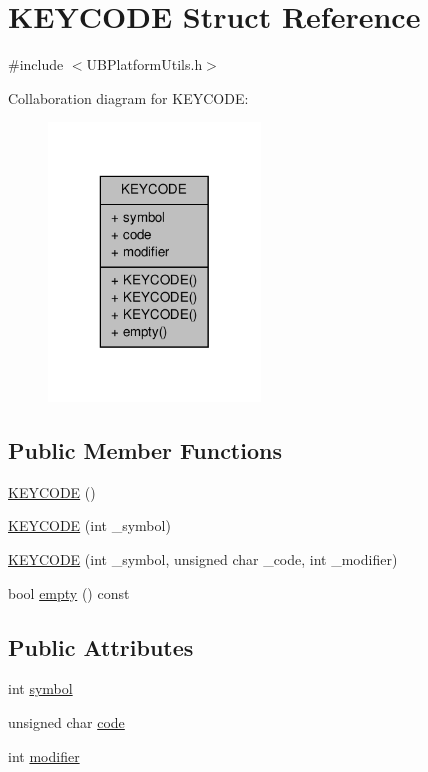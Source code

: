 \hypertarget{struct_k_e_y_c_o_d_e}{\section{K\-E\-Y\-C\-O\-D\-E Struct Reference}
\label{d2/dab/struct_k_e_y_c_o_d_e}
}


{\ttfamily \#include $<$U\-B\-Platform\-Utils.\-h$>$}



Collaboration diagram for K\-E\-Y\-C\-O\-D\-E\-:
\nopagebreak
\begin{figure}[H]
\begin{center}
\leavevmode
\includegraphics[width=160pt]{d5/d05/struct_k_e_y_c_o_d_e__coll__graph}
\end{center}
\end{figure}
\subsection*{Public Member Functions}
\begin{DoxyCompactItemize}
\item 
\hyperlink{struct_k_e_y_c_o_d_e_ae4350f0f4e202d007a74e78865318d94}{K\-E\-Y\-C\-O\-D\-E} ()
\item 
\hyperlink{struct_k_e_y_c_o_d_e_aad5ee6ebcdf27e459c9cce172c090640}{K\-E\-Y\-C\-O\-D\-E} (int \-\_\-symbol)
\item 
\hyperlink{struct_k_e_y_c_o_d_e_a6337fa952359472ee651aaa6f1c01193}{K\-E\-Y\-C\-O\-D\-E} (int \-\_\-symbol, unsigned char \-\_\-code, int \-\_\-modifier)
\item 
bool \hyperlink{struct_k_e_y_c_o_d_e_acb6324cb38828263de48056f11cb03f3}{empty} () const 
\end{DoxyCompactItemize}
\subsection*{Public Attributes}
\begin{DoxyCompactItemize}
\item 
int \hyperlink{struct_k_e_y_c_o_d_e_a4a96f7f24dadfc116f1d51b4a99a95ee}{symbol}
\item 
unsigned char \hyperlink{struct_k_e_y_c_o_d_e_ad5290fbe104d6c227edbea15304141d8}{code}
\item 
int \hyperlink{struct_k_e_y_c_o_d_e_a554fd04de226019a55a6e3c91f908cee}{modifier}
\end{DoxyCompactItemize}


